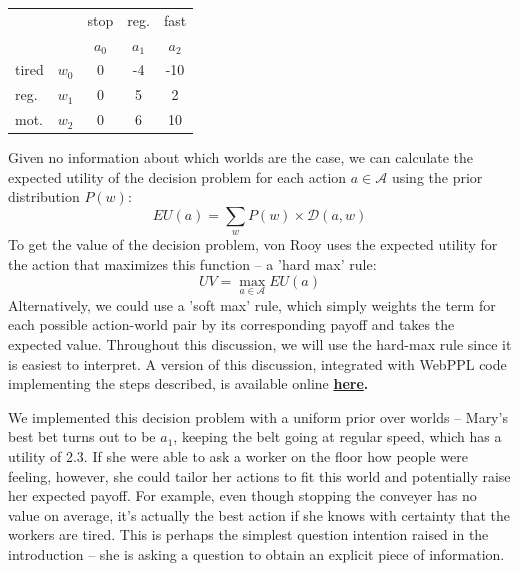 \documentclass[12pt]{amsart}
\begin{document}
\begin{center}
\begin{tabular}{lr|ccc}
&& stop & reg. & fast \\
&& $a_0$ & $a_1$ & $a_2$ \\
\hline
tired & $w_0$ & 0 & -4 & -10 \\
reg. & $w_1$ & 0 & 5& 2 \\
mot. & $w_2$ & 0 & 6& 10 \\
\end{tabular}
\end{center}

Given no information about which worlds are the case, we can calculate the expected utility of the decision problem for each action $a \in \mathcal{A}$ using the prior distribution $P(w)$:
$$EU(a) = \sum_w P(w) \times \mathcal{D}(a, w)$$
To get the value of the decision problem, von Rooy uses the expected utility for the action that maximizes this function -- a 'hard max' rule:
$$UV = \max_{a \in \mathcal{A}}EU(a)$$ Alternatively, we could use a 'soft max' rule, which simply weights the term for each possible action-world pair by its corresponding payoff and takes the expected value. Throughout this discussion, we will use the hard-max rule since it is easiest to interpret. A version of this discussion, integrated with WebPPL code implementing the steps described, is available online \textbf{\href{https://github.com/hawkrobe/Q\_and\_A/blob/master/modeling/q\_and\_a\_inference.md}{here}.}

%
%
%
%

We implemented this decision problem with a uniform prior over worlds -- Mary's best bet turns out to be $a_1$, keeping the belt going at regular speed, which has a utility of 2.3. If she were able to ask a worker on the floor how people were feeling, however, she could tailor her actions to fit this world and potentially raise her expected payoff. For example, even though stopping the conveyer has no value on average, it's actually the best action if she knows with certainty that the workers are tired. This is perhaps the simplest question intention raised in the introduction -- she is asking a question to obtain an explicit piece of information.
\end{document}
